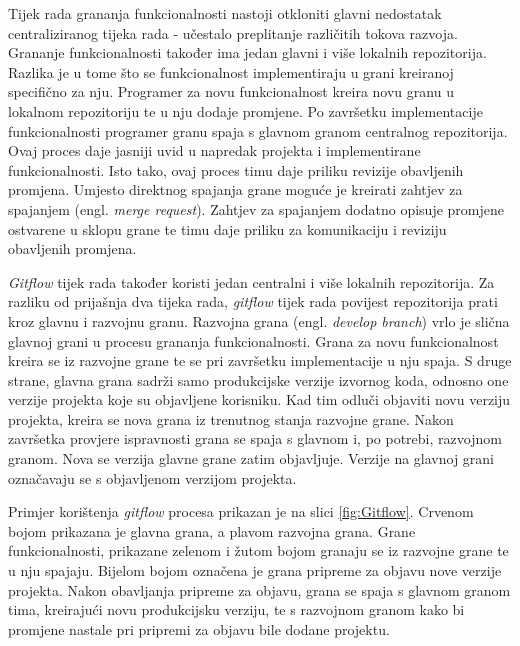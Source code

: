 \documentclass[times, utf8, diplomski, numeric]{fer}
\newcommand{\eng}[1]{(engl. \textit{#1})}
\begin{document}
Tijek rada grananja funkcionalnosti nastoji otkloniti glavni nedostatak centraliziranog tijeka rada - učestalo preplitanje različitih tokova razvoja. Grananje funkcionalnosti također ima jedan glavni i više lokalnih repozitorija. Razlika je u tome što se funkcionalnost implementiraju u grani kreiranoj specifično za nju. Programer za novu funkcionalnost kreira novu granu u lokalnom repozitoriju te u nju dodaje promjene. Po završetku implementacije funkcionalnosti programer granu spaja s glavnom granom centralnog repozitorija. Ovaj proces daje jasniji uvid u napredak projekta i implementirane funkcionalnosti. Isto tako, ovaj proces timu daje priliku revizije obavljenih promjena. Umjesto direktnog spajanja grane moguće je kreirati zahtjev za spajanjem \eng{merge request}. Zahtjev za spajanjem dodatno opisuje promjene ostvarene u sklopu grane te timu daje priliku za komunikaciju i reviziju obavljenih promjena.

\textit{Gitflow} tijek rada također koristi jedan centralni i više lokalnih repozitorija. Za razliku od prijašnja dva tijeka rada, \textit{gitflow} tijek rada povijest repozitorija prati kroz glavnu i razvojnu granu. Razvojna grana \eng{develop branch} vrlo je slična glavnoj grani u procesu grananja funkcionalnosti. Grana za novu funkcionalnost kreira se iz razvojne grane te se pri završetku implementacije u nju spaja. S druge strane, glavna grana sadrži samo produkcijske verzije izvornog koda, odnosno one verzije projekta koje su objavljene korisniku. Kad tim odluči objaviti novu verziju projekta, kreira se nova grana iz trenutnog stanja razvojne grane. Nakon završetka provjere ispravnosti grana se spaja s glavnom i, po potrebi, razvojnom granom. Nova se verzija glavne grane zatim objavljuje. Verzije na glavnoj grani označavaju se s objavljenom verzijom projekta.

Primjer korištenja \textit{gitflow} procesa prikazan je na slici \ref{fig:Gitflow}. Crvenom bojom prikazana je glavna grana, a plavom razvojna grana. Grane funkcionalnosti, prikazane zelenom i žutom bojom granaju se iz razvojne grane te u nju spajaju. Bijelom bojom označena je grana pripreme za objavu nove verzije projekta. Nakon obavljanja pripreme za objavu, grana se spaja s glavnom granom tima, kreirajući novu produkcijsku verziju, te s razvojnom granom kako bi promjene nastale pri pripremi za objavu bile dodane projektu.
\end{document}
